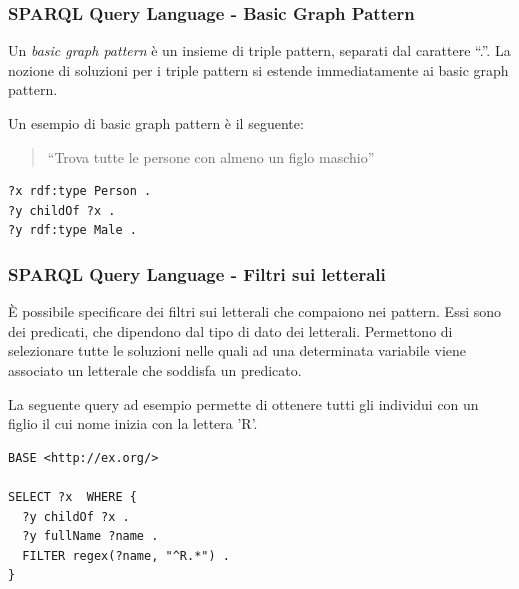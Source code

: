 \documentclass[8pt]{beamer}
\begin{document}
\begin{frame}[fragile]
 \frametitle{SPARQL Query Language - Basic Graph Pattern}
Un \emph{basic graph pattern} \`e un insieme di triple pattern, separati
dal carattere ``.''. La nozione di soluzioni per i triple pattern si estende 
immediatamente ai basic graph pattern.
\vspace{\baselineskip}

Un esempio di basic graph pattern \`e il seguente:
\begin{quote}
``Trova tutte le persone con almeno un figlo maschio''
\end{quote}
\begin{Verbatim}[fontsize=\small]
?x rdf:type Person .
?y childOf ?x .
?y rdf:type Male .
\end{Verbatim}
\end{frame}

\begin{frame}[fragile]
 \frametitle{SPARQL Query Language - Filtri sui letterali}
\`E possibile specificare dei filtri sui letterali che compaiono nei pattern.
Essi sono dei predicati, che dipendono dal tipo di dato dei letterali.
Permettono di selezionare tutte le soluzioni nelle quali ad una 
determinata variabile viene associato un letterale che soddisfa un predicato.
\vspace{\baselineskip}

La seguente query ad esempio permette di ottenere tutti
gli individui con un figlio il cui nome inizia con la lettera 'R'.
\begin{Verbatim}[fontsize=\small]
BASE <http://ex.org/>

SELECT ?x  WHERE { 
  ?y childOf ?x .
  ?y fullName ?name .
  FILTER regex(?name, "^R.*") .
}
\end{Verbatim}
\end{frame}
\end{document}

